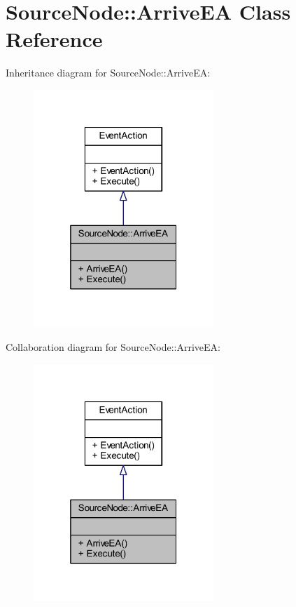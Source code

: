 \hypertarget{class_source_node_1_1_arrive_e_a}{}\section{Source\+Node\+:\+:Arrive\+EA Class Reference}
\label{class_source_node_1_1_arrive_e_a}


Inheritance diagram for Source\+Node\+:\+:Arrive\+EA\+:\nopagebreak
\begin{figure}[H]
\begin{center}
\leavevmode
\includegraphics[width=193pt]{class_source_node_1_1_arrive_e_a__inherit__graph}
\end{center}
\end{figure}


Collaboration diagram for Source\+Node\+:\+:Arrive\+EA\+:\nopagebreak
\begin{figure}[H]
\begin{center}
\leavevmode
\includegraphics[width=193pt]{class_source_node_1_1_arrive_e_a__coll__graph}
\end{center}
\end{figure}
